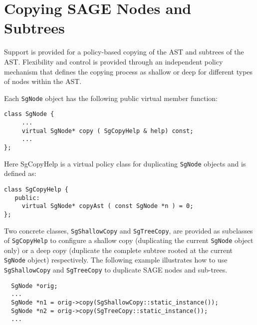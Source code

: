 \section { Copying SAGE Nodes and Subtrees}

    Support is provided for a policy-based copying of the AST and subtrees
of the AST.  Flexibility and control is provided through an independent
policy mechanism that defines the copying process as shallow or deep for
different types of nodes within the AST.


  Each {\tt SgNode} object has the following public virtual member function: 

{\indent
{\mySmallFontSize

\begin{verbatim}
class SgNode {
     ...
     virtual SgNode* copy ( SgCopyHelp & help) const;
     ...
};
\end{verbatim}
}}

  Here SgCopyHelp is a virtual policy class for duplicating 
{\tt SgNode} objects and is defined as:

{\indent
{\mySmallFontSize

\begin{verbatim}
class SgCopyHelp {
   public:
     virtual SgNode* copyAst ( const SgNode *n ) = 0;
};
\end{verbatim}
}}

Two concrete classes, {\tt SgShallowCopy} and {\tt SgTreeCopy}, are provided as 
subclasses of {\tt SgCopyHelp} to configure a shallow copy (duplicating 
the current {\tt SgNode} object only) or a deep copy (duplicate the complete
subtree rooted at the current {\tt SgNode} object) respectively. The following
example illustrates how to use {\tt SgShallowCopy} and {\tt SgTreeCopy} 
to duplicate SAGE nodes and sub-trees.

{\indent
{\mySmallFontSize

\begin{verbatim}
  SgNode *orig;
  ...
  SgNode *n1 = orig->copy(SgShallowCopy::static_instance());
  SgNode *n2 = orig->copy(SgTreeCopy::static_instance());
  ... 
\end{verbatim}
}}


